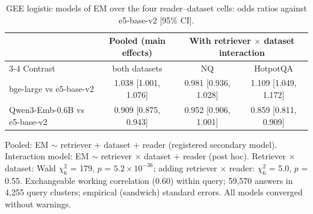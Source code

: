 \begin{table}[t]
\centering
\small
\caption{GEE logistic models of EM over the four reader--dataset cells: odds ratios against e5-base-v2 [95\% CI].}
\label{tab:gee}
\begin{tabular}{lccc}
\toprule
 & Pooled (main effects) & \multicolumn{2}{c}{With retriever $\times$ dataset interaction} \\
\cmidrule(lr){3-4}
Contrast & both datasets & NQ & HotpotQA \\
\midrule
bge-large vs e5-base-v2 & 1.038 [1.001, 1.076] & 0.981 [0.936, 1.028] & 1.109 [1.049, 1.172] \\
Qwen3-Emb-0.6B vs e5-base-v2 & 0.909 [0.875, 0.943] & 0.952 [0.906, 1.001] & 0.859 [0.811, 0.909] \\
\bottomrule
\end{tabular}
\par\smallskip\parbox{\linewidth}{\footnotesize Pooled: EM $\sim$ retriever + dataset + reader (registered secondary model). Interaction model: EM $\sim$ retriever $\times$ dataset + reader (post hoc). Retriever $\times$ dataset: Wald $\chi^2_{6}$ = 179, $p$ = $5.2\times10^{-36}$; adding retriever $\times$ reader: $\chi^2_{6}$ = 5.0, $p$ = 0.55. Exchangeable working correlation (0.60) within query; 59,570 answers in 4,255 query clusters; empirical (sandwich) standard errors. All models converged without warnings.}
\end{table}
